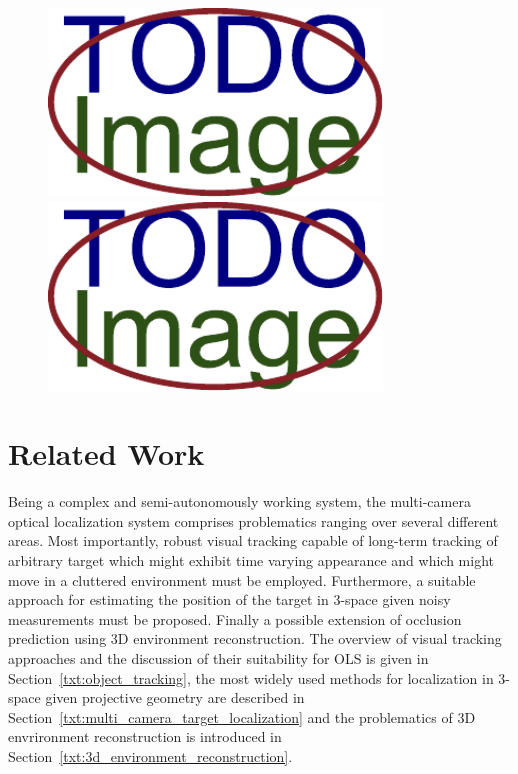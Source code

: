 \begin{figure}[t]\centering %
	\centering
	\includegraphics[width=0.45\linewidth, height=5cm]{fig/placeholder.pdf}
	\includegraphics[width=0.45\linewidth, height=5cm]{fig/placeholder.pdf}
	\caption{}
	\label{fig:WidePicture}
\end{figure}

\vata[4]

\chapter{Related Work}

Being a complex and semi-autonomously working system, the multi-camera optical localization system comprises problematics ranging over several different areas. Most importantly, robust visual tracking capable of long-term tracking of arbitrary target which might exhibit time varying appearance and which might move in a cluttered environment must be employed. Furthermore, a suitable approach for estimating the position of the target in 3-space given noisy measurements must be proposed. Finally a possible extension of occlusion prediction using 3D environment reconstruction. The overview of visual tracking approaches and the discussion of their suitability for OLS is given in Section~\ref{txt:object_tracking}, the most widely used methods for localization in 3-space given projective geometry are described in Section~\ref{txt:multi_camera_target_localization} and the problematics of 3D envrironment reconstruction is introduced in Section~\ref{txt:3d_environment_reconstruction}.


